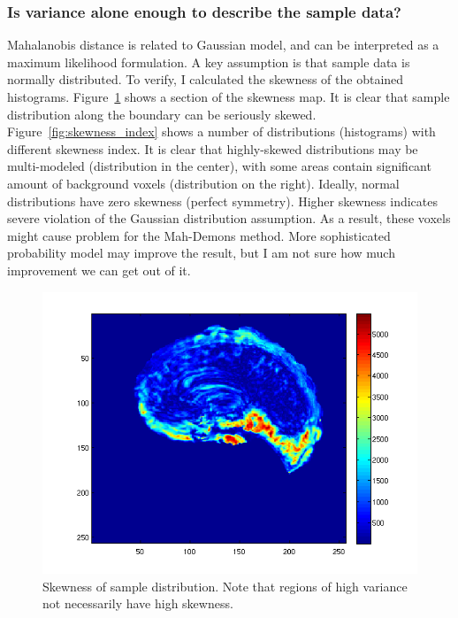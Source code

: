 \documentclass[preprint,review,12pt]{elsarticle}
\begin{document}
\subsubsection{Is variance alone enough to describe the sample data?}
Mahalanobis distance is related to Gaussian model, and can be interpreted as a maximum likelihood formulation. A key assumption is that sample data is normally distributed. To verify, I calculated the skewness of the obtained histograms. Figure~\ref{fig:skewness} shows a section of the skewness map. It is clear that sample distribution along the boundary can be seriously skewed. Figure~\ref{fig:skewness_index} shows a number of distributions (histograms) with different skewness index. It is clear that  highly-skewed distributions may be multi-modeled (distribution in the center), with some areas contain significant amount of background voxels (distribution on the right).
Ideally, normal distributions have zero skewness (perfect symmetry). Higher skewness indicates severe violation of the Gaussian distribution assumption. As a result, these voxels might cause problem for the Mah-Demons method. More sophisticated probability model may improve the result, but I am not sure how much improvement we can get out of it.

\begin{figure}[h!!!!!!!!!!!!tb]
\begin{center}
	\includegraphics[width=.8\linewidth]{figs/skewness.png}
\end{center}
\caption{Skewness of sample distribution. Note that regions of high variance not necessarily have high skewness.}
\label{fig:skewness}
\end{figure}
\end{document}
